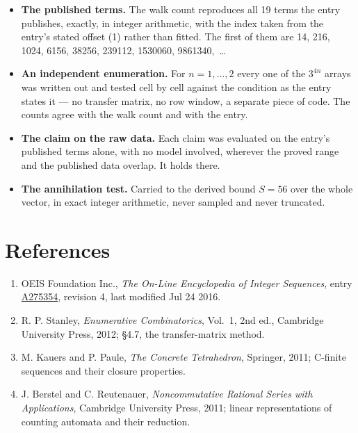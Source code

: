 \documentclass[11pt]{article}
\theoremstyle{definition}
\begin{document}
\begin{itemize}

\item {\bfseries The published terms.} The walk count reproduces all 19 terms the entry publishes, exactly, in integer arithmetic, with the index taken from the entry's stated offset (1) rather than fitted. The first of them are 14, 216, 1024, 6156, 38256, 239112, 1530060, 9861340,~\dots

\item {\bfseries An independent enumeration.} For $n = 1,\dots,2$ every one of the $3^{4n}$ arrays was written out and tested cell by cell against the condition as the entry states it --- no transfer matrix, no row window, a separate piece of code. The counts agree with the walk count and with the entry.

\item {\bfseries The claim on the raw data.} Each claim was evaluated on the entry's published terms alone, with no model involved, wherever the proved range and the published data overlap. It holds there.

\item {\bfseries The annihilation test.} Carried to the derived bound $S = 56$ over the whole vector, in exact integer arithmetic, never sampled and never truncated.

\end{itemize}

\section{References}

\begin{enumerate}

\item OEIS Foundation Inc., \emph{The On-Line Encyclopedia of Integer Sequences}, entry \href{https://oeis.org/A275354}{A275354}, revision 4, last modified Jul 24 2016.

\item R. P. Stanley, \emph{Enumerative Combinatorics}, Vol.~1, 2nd ed., Cambridge University Press, 2012; \S4.7, the transfer-matrix method.

\item M. Kauers and P. Paule, \emph{The Concrete Tetrahedron}, Springer, 2011; C-finite sequences and their closure properties.

\item J. Berstel and C. Reutenauer, \emph{Noncommutative Rational Series with Applications}, Cambridge University Press, 2011; linear representations of counting automata and their reduction.

\end{enumerate}
\end{document}
